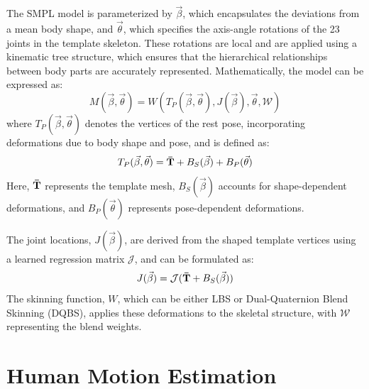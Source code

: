 The SMPL model is parameterized by $\vec{\beta}$, which encapsulates the deviations from a mean body shape, and $\vec{\theta}$, which specifies the axis-angle rotations of the 23 joints in the template skeleton. These rotations are local and are applied using a kinematic tree structure, which ensures that the hierarchical relationships between body parts are accurately represented. Mathematically, the model can be expressed as:
\begin{equation}
    M(\vec{\beta}, \vec{\theta}) = W(T_P(\vec{\beta}, \vec{\theta}), J(\vec{\beta}), \vec{\theta}, \mathcal{W})
\end{equation}
where $T_P(\vec{\beta}, \vec{\theta})$ denotes the vertices of the rest pose, incorporating deformations due to body shape and pose, and is defined as:
\begin{equation}
    T_P(\vec{\beta}, \vec{\theta}) = \boldsymbol{\mathbf{\bar{T}}} + B_S(\vec{\beta}) + B_P(\vec{\theta})
\end{equation}
Here, $\boldsymbol{\mathbf{\bar{T}}}$ represents the template mesh, $B_S(\vec{\beta})$ accounts for shape-dependent deformations, and $B_P(\vec{\theta})$ represents pose-dependent deformations.

The joint locations, $J(\vec{\beta})$, are derived from the shaped template vertices using a learned regression matrix $\mathcal{J}$, and can be formulated as:
\begin{equation} \label{eq:smpl-joints}
    J(\vec{\beta}) = \mathcal{J}(\boldsymbol{\mathbf{\bar{T}}} + B_S(\vec{\beta}))
\end{equation}
The skinning function, $W$, which can be either LBS or Dual-Quaternion Blend Skinning (DQBS), applies these deformations to the skeletal structure, with $\mathcal{W}$ representing the blend weights.

\section{Human Motion Estimation}

